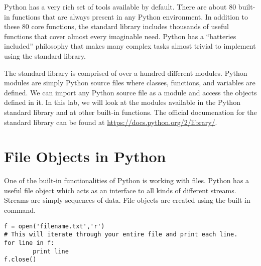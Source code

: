 
Python has a very rich set of tools available by default.
There are about 80 built-in functions that are always present in any Python environment.
In addition to these 80 core functions, the standard library includes thousands of useful functions that cover almost every imaginable need.
Python has a ``batteries included'' philosophy that makes many complex tasks almost trivial to implement using the standard library.


The standard library is comprised of over a hundred different modules.
Python modules are simply Python source files where classes, functions, and variables are defined.
We can import any Python source file as a module and access the objects defined in it.
In this lab, we will look at the modules available in the Python standard library and at other built-in functions. The official documenation for the standard library can be found at \url{https://docs.python.org/2/library/}.


\section*{File Objects in Python}
One of the built-in functionalities of Python is working with files.
Python has a useful file object which acts as an interface to all kinds of different streams. Streams are simply sequences of data.
File objects are created using the built-in  command.

\begin{lstlisting}
f = open('filename.txt','r')
# This will iterate through your entire file and print each line.
for line in f:
        print line
f.close()
\end{lstlisting}

